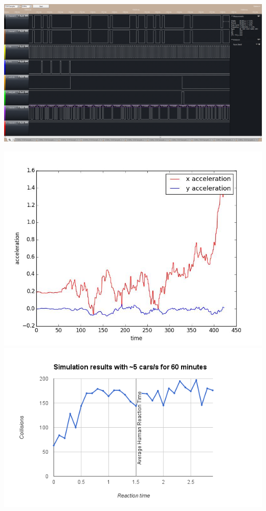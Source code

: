 \documentclass[a0,landscape]{a0poster}
\begin{document}
\begin{multicols}{3}
\includegraphics[width=0.9\linewidth]{UART-CAN_PacketTranslation}
\\

\begin{vwcol}[widths={0.4,0.6}]
\includegraphics[scale=0.5]{imu_plot2}
\includegraphics[scale=1.1]{reaction_plot}
\end{vwcol}
\vspace{3em}


\end{multicols}
\end{document}
